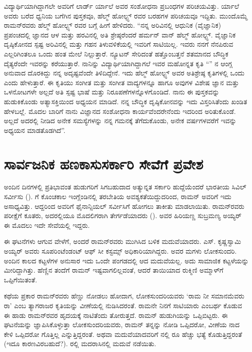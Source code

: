 ವಿದ್ಯಾರ್ಥಿಯಾಗಿದ್ದಾಗಲೇ ಅವರಿಗೆ ಲಾರ್ಡ್ ರ್ಯಾಲೆ ಅವರ ಸಂಶೋಧನಾ ಪ್ರಬಂಧಗಳ ಪರಿಚಯವಿತ್ತು. ರ್ಯಾಲೆ ಅವರು ಬರೆದ ಧ್ವನಿಯ ಬಗೆಗಿನ ಪುಸ್ತಕವೂ, ಹೆಲ್ಮ್ ‍ಹೋಲ್ಟ್ಸ್ ರವರ ಬರಹಗಳ ಪರಿಚಯವೂ ಇದ್ದಿತು. ಮುಂದೊಮ್ಮೆ ರಾಮನ್‍ರವರು ಹೆಲ್ಮ್ ‍ಹೋಲ್ಟ್ಸ್ ರವರ ಬಗ್ಗೆ ಹೀಗೆ ಹೇಳಿದರು. “ನನ್ನ ಅರಿವಿನಲ್ಲಿ ಆಧುನಿಕ (ವೈಜ್ಞಾನಿಕ) ಪ್ರಪಂಚದಲ್ಲಿ ಜ್ಞಾನದ ಆಳ ಮತ್ತು ಹರವಿನಲ್ಲಿ ಅತಿ ಶ್ರೇಷ್ಠರೆಂದರೆ ಹರ್ಮನ್ ವಾನ್ ಹೆಲ್ಮ್ ‍ಹೋಲ್ಟ್ಸ್. ವೈಜ್ಞಾನಿಕ ದೃಷ್ಠಿಕೋನದ ಸ್ಪಷ್ಟ ಅರಿವಿನಲ್ಲಿ ಮತ್ತು ಗಹನ ತಿಳುವಳಿಕೆಯಲ್ಲಿ ಇವರಿಗೆ ಸಾಟಿಯಿಲ್ಲ. ಇವರು ನನಗೆ ನೆನಪಿರುವ ಎಲ್ಲರಿಗಿಂತಲೂ ಒಂದು ಹಂತ ಮೇಲೆ ನಿಲ್ಲುತ್ತಾರೆ. ನ್ಯೂಟನ್ ಸೇರಿದಂತೆ ಹತ್ತೊಂಬತ್ತನೆ ಶತಮಾನದ ಬೌದ್ಧಿಕ ದೈತ್ಯರೆಂದೇ ಇವರನ್ನು ಕರೆಯುತ್ತಾರೆ. ನಾನಿನ್ನು ವಿದ್ಯಾರ್ಥಿಯಾಗಿದ್ದಾಗಲೆ ಇವರ ಮಹೋನ್ನತ ಕೃತಿ “” ನ ಆಂಗ್ಲ ಅನುವಾದ ದೊರಕಿದ್ದು ನನ್ನ ಅದೃಷ್ಟವೆಂದೇ ತಿಳಿದಿದ್ದೇನೆ. ಇದು ಹೆಲ್ಮ್ ‍ಹೋಲ್ಟ್ಸ್ ಅವರ ಅತಿಶ್ರೇಷ್ಠ ಕೃತಿಗಳಲ್ಲಿ ಒಂದು ಎಂದು ಹೇಳುತ್ತಾರೆ. ಈ ಕೃತಿಯು ಸಂಗೀತ ಮತ್ತು ಸಂಗೀತ ವಾದ್ಯಗಳನ್ನೂ ಹಾಗೂ ಅವುಗಳ ವಿಶೇಷ ಜ್ಞಾನ ಮತ್ತು ಒಳನೋಟಗಳೇ ಅಲ್ಲದೆ ಅತಿ ಸ್ಪಷ್ಟ ಭಾಷೆ ಮತ್ತು ನಿರೂಪಣೆಗಳನ್ನೊಳಗೊಂಡಿದೆ. ನಾನು ಈ ಪುಸ್ತಕವನ್ನು ಹುಡುಕಿಕೊಂಡು ಅತ್ಯಾಸಕ್ತಿಯಿಂದ ಅಧ್ಯಯನ ಮಾಡಿದೆ. ನನ್ನ ಬೌದ್ಧಿಕ ದೃಷ್ಠಿಕೋನವನ್ನು ಇದು ವಿಸ್ತರಿಸಿತೆಂದು ಖಂಡಿತ ಹೇಳಬಲ್ಲೆ. ಮೊದಲ ಬಾರಿಗೆ ನಾನು ವಿಜ್ಞಾನದ ಸಂಶೋಧನಾ ಕಾರ್ಯವೆಂದರೇನೆಂದು ಇದರಿಂದ ಅರಿತುಕೊಂಡೆ. ಅಲ್ಲದೆ ಅದರಲ್ಲಿ ನೀಡಿದ ಅನೇಕ ಸಮಸ್ಯೆಗಳನ್ನು ನನ್ನ ಗಮನಕ್ಕೆ ತೆಗೆದುಕೊಂಡು, ಅನೇಕ ವರ್ಷಗಳವರೆಗೆ ಇವನ್ನು ಅಧ್ಯಯನ ಮಾಡತೊಡಗಿದೆ”.


\section{ಸಾರ್ವಜನಿಕ ಹಣಕಾಸುಸರ್ಕಾರಿ ಸೇವೆಗೆ ಪ್ರವೇಶ}

ಅಂದಿನ ದಿನಗಳಲ್ಲಿ ಪ್ರತಿಭಾವಂತ ಹುಡುಗರಿಗೆ ಸಿಗಬಹುದಾದ ಅತ್ಯುನ್ನತ ಸರ್ಕಾರಿ ಹುದ್ದೆಯೆಂದರೆ ಭಾರತೀಯ ಸಿವಿಲ್ ಸರ್ವೀಸು ().  ಗೆ ಕೊಂಚಕಾಲ ಇಂಗ್ಲೆಂಡಿನಲ್ಲಿ ತರಬೇತಿಯ ಅವಶ್ಯಕತೆಯಿದ್ದುದರಿಂದ, ರಾಮನ್ ಅವರಿಗೆ ಇದು ಅಸಾಧ್ಯವಿತ್ತು. ಆದ್ದರಿಂದ ಅವರಿಗೆ ಫೈನಾನ್ಸಿಯಲ್ ಸರ್ವೀಸಿಗೆ  ಹೋಗಲು ತಾಕೀತು ಮಾಡಲಾಯಿತು. ರಾಮನ್‍ರವರು  ಪರೀಕ್ಷೆಗೆ ಕೂತರು, ಅದರಲ್ಲಿಯೂ ಮೊದಲಿಗರಾಗಿ ತೇರ್ಗಡೆಯಾದರು (). ಅವರ ಹಿರಿಯಣ್ಣ ಸುಬ್ರಮಣ್ಯ ಅಯ್ಯರ್ ಈ ಮೊದಲು ಇದೇ ಸೇವೆಯಲ್ಲಿ ಇದ್ದರು.

ಈ ಘಟನೆಗಳು ಆಗುವ ವೇಳೆಗೆ, ಅಂದರೆ ರಾಮನ್‍ರವರು  ಮುಗಿಸಿದ ಬಳಿಕ ಮದುವೆಯಾದರು. ಎಸ್. ಕೃಷ್ಣಸ್ವಾಮಿ ಅಯ್ಯರ್ ಅವರು ಸೂಪರಿಂಟೆಂಡಂಟ್ ಆಫ್ ಸೀ ಕಸ್ಟಮ್ಸ್ ಅಧಿಕಾರಿಯಾಗಿದ್ದರು. ಅವರ ಮಗಳು ಲೋಕಸುಂದರಿ. ಅಂದಿನ ಕಾಲದ ಕಟ್ಟಳೆಗಳ ಅನುಸಾರ ಇದು ಒಂದೇ ಪಂಗಡದಲ್ಲಿ ಆದ ಮದುವೆಯಲ್ಲ. ಅದು ಸಾಮಾಜಿಕ ಕಟ್ಟಳೆಯನ್ನು ಮೀರಿದ್ದಾಗಿತ್ತು. ಹೆಣ್ಣಿನ ತಂದೆಗೆ ರಾಮನ್ ಇಷ್ಟವಾಗಲಿಲ್ಲವಂತೆ, ಆದರೆ ತಾಯಿಯಾದ ರುಕ್ಮಿಣಿ ಅಮ್ಮಾಳ್‍ಗೆ ಒಪ್ಪಿಗೆಯಿತಂತೆ.

ಕಥೆಯ ಪ್ರಕಾರ ರಾಮನ್‍ರವರು ಹೆಣ್ಣು ನೋಡಲು ಹೋದಾಗ, ಲೋಕಸುಂದರಿಯವರು ‘ರಾಮ ನೀ ಸಮಾನಮೆವರು ರಾ’ ಎಂಬ ತ್ಯಾಗರಾಜರ ಕೃತಿಯನ್ನು ವೀಣೆಯಲ್ಲಿ ನುಡಿಸಿದರಂತೆ. ರಾಮನೇ ನಿನಗೆ ಸಾಟಿಯಾರು ಎಂಬರ್ಥ ಕೊಡುವ ಈ ಹಾಡು ರಾಮನ್‍ರವರ ಹೃದಯಕ್ಕೆ ನಾಟಿತೆಂದು ತೋರುತ್ತದೆ. ರಾಮನ್ ಹುಡುಗಿಯನ್ನು ಒಪ್ಪಿಬಿಟ್ಟರು. ಈ ಘಟನೆಯನ್ನು ಜ್ಞಾಪಿಸಿಕೊಳ್ಳುತ್ತಾ ಲೋಕಸುಂದರಿಯವರು, ರಾಮನ್ ತನ್ನನ್ನು ನೋಡಿ ಒಪ್ಪಿದರೋ, ವೀಣೆಯ ನಾದ ಕೇಳಿ ಒಪ್ಪಿದರೋ ಗೊತ್ತಿಲ್ಲ ಎನ್ನುತ್ತಿದ್ದರಂತೆ. ಅಥವಾ ಮದುವೆಯಾದವರಿಗೆ  ನಲ್ಲಿ ರೂ  ಹೆಚ್ಚು ಭತ್ಯೆ ಕೊಡುತ್ತಿದ್ದರಂತೆ (ಇದೂ ಕಾರಣವಿರಬಹುದೆ?). ರಲ್ಲಿ ಮದರಾಸಿನಲ್ಲಿ ಮದುವೆ ನಡೆಯಿತು.

